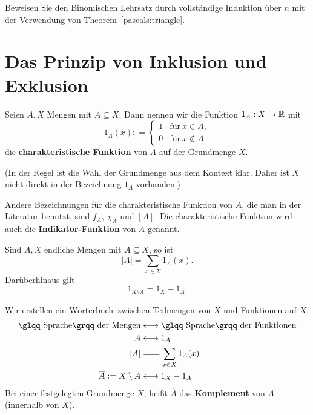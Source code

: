 \begin{aufg}
	Beweisen Sie den Binomischen Lehrsatz durch vollständige Induktion über $n$ mit der Verwendung von Theorem~\ref{pascals:triangle}. 
\end{aufg} 


\section{Das Prinzip von Inklusion und Exklusion} 

\begin{defn}
	Seien $A,X$ Mengen mit $A \subseteq X$. Dann nennen wir die Funktion $1_A : X \to \mathbb{R}$ mit 
	\[
		1_A(x): = \begin{cases}
				1 &  \text{für} \ x \in A, 
			\\	0 & \text{für} \ x \not\in A
			\end{cases} 
	\]
	die \textbf{charakteristische Funktion} von $A$ auf der Grundmenge $X$. 
	
	(In der Regel ist die Wahl der Grundmenge aus dem Kontext klar. Daher ist $X$ nicht direkt in der Bezeichnung $1_A$ vorhanden.)
\end{defn} 

\begin{bem}
	Andere Bezeichnungen für die charakteristische Funktion von $A$, die man in der Literatur benutzt, sind $f_A$, $\chi_A$ und $[A]$. Die charakteristische Funktion wird auch die \textbf{Indikator-Funktion} von $A$ genannt. 
\end{bem} 

\begin{bem}
	Sind $A, X$ endliche Mengen mit $A \subseteq X$, so ist 
	\[	
			|A| = \sum_{x \in X} 1_A(x).
	\] 
	Darüberhinaus gilt 
	\[	
		1_{X \setminus A} = 1_X - 1_A. 
	\]
\end{bem}

\begin{bem}
Wir erstellen ein \glqq Wörterbuch\grqq\ zwischen Teilmengen von $X$ und Funktionen auf $X$: 
	\begin{align*}
		\text{\glqq Sprache\grqq\ der Mengen} & \longleftrightarrow \text{\glqq Sprache\grqq\ der Funktionen} 
		\\ A & \longleftrightarrow 1_A
		\\ |A| & =\joinrel=\joinrel= \sum_{x \in X} 1_A(x)
		\\ \overline{A}:=X \setminus A & \longleftrightarrow 1_X - 1_A
	\end{align*}
	Bei einer festgelegten Grundmenge $X$, hei\ss t $\overline{A}$ das \textbf{Komplement} von $A$ (innerhalb von $X$). 
\end{bem} 

